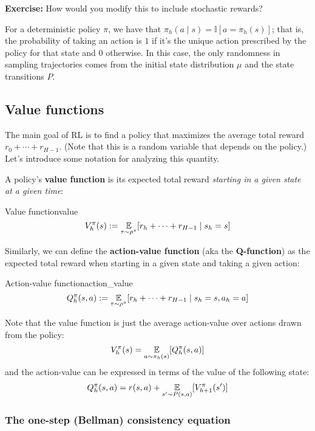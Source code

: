 \documentclass[\main/main]{subfiles}
\begin{document}
\textbf{Exercise:} How would you modify this to include stochastic rewards?

For a deterministic policy $\pi$, we have that $\pi_h(a \mid s) = \mathbb{I}[a = \pi_h(s)]$; that is, the probability of taking an action is $1$ if it's the unique action prescribed by the policy for that state and $0$ otherwise. In this case, the only randomness in sampling trajectories comes from the initial state distribution $\mu$ and the state transitions $P$.

\subsection{Value functions}

The main goal of RL is to find a policy that maximizes the average total reward $r_0 + \cdots + r_{H-1}$. (Note that this is a random variable that depends on the policy.) Let's introduce some notation for analyzing this quantity.

A policy's \textbf{value function} is its expected total reward \emph{starting in a given state at a given time}:

\begin{definition}{Value function}{value}
    \[
        V_h^\pi(s) := \operatorname*{\mathbb{E}}_{\tau \sim \rho^\pi} [r_h + \cdots + r_{H-1} \mid s_h = s]
    \]
\end{definition}

Similarly, we can define the \textbf{action-value function} (aka the \textbf{Q-function}) as the expected total reward when starting in a given state and taking a given action:

\begin{definition}{Action-value function}{action_value}
    \[
        Q_h^\pi(s, a) := \operatorname*{\mathbb{E}}_{\tau \sim \rho^\pi} [r_h + \cdots + r_{H-1} \mid s_h = s, a_h = a]
    \]
\end{definition}

Note that the value function is just the average action-value over actions drawn from the policy:
\[
    V_h^\pi(s) = \operatorname*{\mathbb{E}}_{a \sim \pi_h(s)} [Q_h^\pi(s, a)]
\]
and the action-value can be expressed in terms of the value of the following state:
\[
    Q_h^\pi(s, a) = r(s, a) + \operatorname*{\mathbb{E}}_{s' \sim P(s, a)} [V_{h+1}^\pi(s')]
\]

\subsubsection{The one-step (Bellman) consistency equation}
\end{document}
